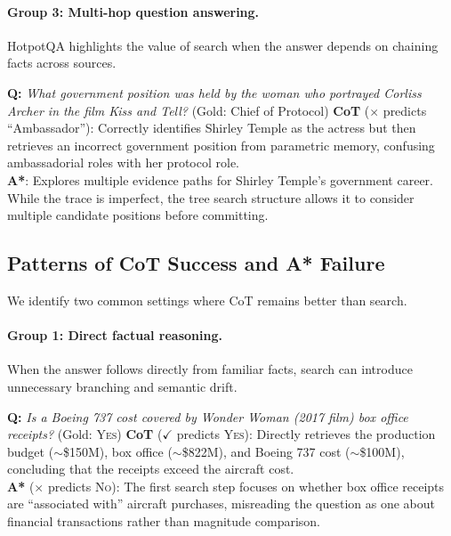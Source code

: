 \documentclass[11pt]{article}
\begin{document}
{\paragraph{Group 3: Multi-hop question answering.}
HotpotQA highlights the value of search when the answer depends on chaining facts across sources.

\begin{examplebox}[title=HotpotQA --- Multi-hop Chaining]
\textbf{Q:} \emph{What government position was held by the woman who portrayed Corliss Archer in the film \textit{Kiss and Tell}?} \quad (Gold: Chief of Protocol)
\tcblower
\textbf{CoT} ($\times$ predicts ``Ambassador''): Correctly identifies Shirley Temple as the actress but then retrieves an incorrect government position from parametric memory, confusing ambassadorial roles with her protocol role.\\[4pt]
\textbf{A*}: Explores multiple evidence paths for Shirley Temple's government career. While the trace is imperfect, the tree search structure allows it to consider multiple candidate positions before committing.
\end{examplebox}

\subsection{Patterns of CoT Success and A* Failure}
\label{app:cot_success}

We identify two common settings where CoT remains better than search.

\paragraph{Group 1: Direct factual reasoning.}
When the answer follows directly from familiar facts, search can introduce unnecessary branching and semantic drift.

\begin{examplebox}[title=StrategyQA --- Direct Factual Reasoning]
\textbf{Q:} \emph{Is a Boeing 737 cost covered by \textit{Wonder Woman} (2017 film) box office receipts?} \quad (Gold: \textsc{Yes})
\tcblower
\textbf{CoT} ($\checkmark$ predicts \textsc{Yes}): Directly retrieves the production budget ($\sim$\$150M), box office ($\sim$\$822M), and Boeing 737 cost ($\sim$\$100M), concluding that the receipts exceed the aircraft cost.\\[4pt]
\textbf{A*} ($\times$ predicts \textsc{No}): The first search step focuses on whether box office receipts are ``associated with'' aircraft purchases, misreading the question as one about financial transactions rather than magnitude comparison.
\end{examplebox}

}
\end{document}
